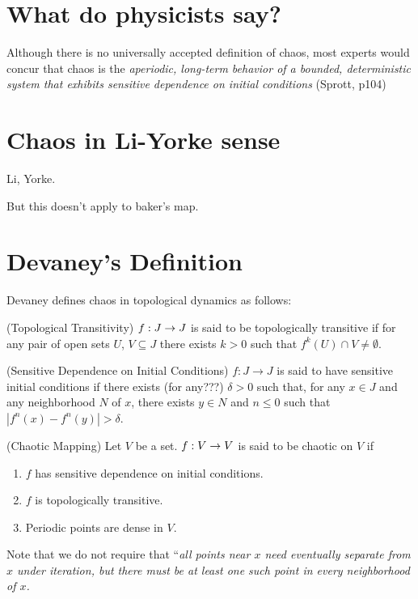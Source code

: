\documentclass[11pt]{article}
\begin{document}
\section{What do physicists say?}
Although there is no universally accepted definition of chaos,
most experts would concur that chaos is the {\it aperiodic,
  long-term behavior of a bounded, deterministic system
that exhibits sensitive dependence on initial conditions} (Sprott, p104)
\section{Chaos in Li-Yorke sense}
\begin{proposition}
  Li, Yorke.
\end{proposition}

But this doesn't apply to baker's map.

\section{Devaney's Definition}
Devaney defines chaos in topological dynamics as follows:


\begin{definition}
  (Topological Transitivity) $f: J \rightarrow J$ is said to be topologically
  transitive if for any pair of open sets $U$, $V \subseteq J$
  there exists $k > 0$ such that $f^k(U) \cap V \neq \emptyset$.
\end{definition}
\begin{definition}
  (Sensitive Dependence on Initial Conditions) $f: J \rightarrow J$ 
  is said to have sensitive initial conditions if there exists (for any???) $\delta > 0$
  such that, for any $x \in J$ and any neighborhood $N$ of $x$,
  there exists $y\in N$ and $n\leq 0$ such that $|f^n(x) - f^n(y)|>\delta$.
\end{definition}

\begin{definition}
  (Chaotic Mapping) Let $V$ be a set. $f: V\rightarrow V$ is said to be chaotic on $V$ if
  \begin{enumerate}
    \item $f$ has sensitive dependence on initial conditions.
    \item $f$ is topologically transitive.
    \item Periodic points are dense in $V$.
  \end{enumerate}
\end{definition}

Note that we do not require that
``\it{all} points near $x$ need eventually separate from $x$
under iteration, but there must be at least one such point in
every neighborhood of $x$.
\end{document}
